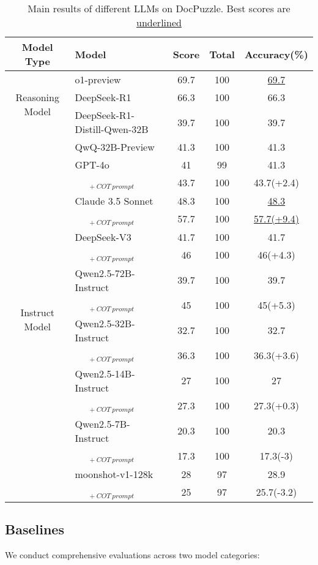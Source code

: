 \begin{table*}[]
    \centering
    \begin{tabular}{clccc}
   \toprule  
 Model Type  & Model  & Score & Total & Accuracy(\%) \\
\hline
\multirow{3}{*}{Reasoning Model}   & o1-preview   & 69.7 & 100 & \underline{69.7} \\
 & DeepSeek-R1 & 66.3 & 100 & 66.3 \\
  & DeepSeek-R1-Distill-Qwen-32B & 39.7 & 100 & 39.7 \\
 & QwQ-32B-Preview  & 41.3 & 100 & 41.3 \\
 \hline
 \multirow{15}{*}{Instruct Model}  & GPT-4o & 41 & 99 & 41.3 \\
  &  \ \ \  $_{+\  COT\ prompt}$ & 43.7 & 100 & 43.7(+2.4) \\
   & Claude 3.5 Sonnet & 48.3 & 100 & \underline{48.3} \\
  & \ \ \  $_{+\  COT\ prompt}$ & 57.7 & 100 & \underline{57.7(+9.4)} \\
   &  DeepSeek-V3 & 41.7 & 100 & 41.7 \\
 & \ \ \ $_{+\  COT\ prompt}$ & 46 & 100 & 46(+4.3) \\
&  Qwen2.5-72B-Instruct & 39.7 & 100 & 39.7 \\
 & \ \ \ $_{+\  COT\ prompt}$ & 45 & 100 & 45(+5.3) \\
 & Qwen2.5-32B-Instruct & 32.7& 100&32.7 \\
& \ \ \ $_{+\  COT\ prompt}$ & 36.3&100&36.3(+3.6) \\
& Qwen2.5-14B-Instruct & 27 & 100 & 27\\
& \ \ \ $_{+\  COT\ prompt}$ &27.3 &100&27.3(+0.3) \\
&  Qwen2.5-7B-Instruct & 20.3 &100 &20.3 \\
& \ \ \ $_{+\  COT\ prompt}$ &17.3&100 & 17.3(-3) \\
 & moonshot-v1-128k & 28 & 97 & 28.9 \\ 
   & \ \ \ $_{+\  COT\ prompt}$ & 25 & 97 & 25.7(-3.2)\\
 \bottomrule
    \end{tabular}
    \caption{Main results of different LLMs on DocPuzzle. Best scores are \underline{underlined}}
    \label{tab:main_results}
\end{table*}


\subsection{Baselines}
We conduct comprehensive evaluations across two model categories:

